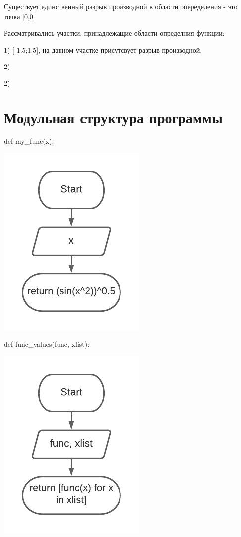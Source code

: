 Существует единственный разрыв производной в области опеределения - это точка [0,0]

Рассматривались участки, принадлежащие области определния функции: 

1) [-1.5;1.5], на данном участке присутсвует разрыв производной. 

2) \begin{math} 
	[\sqrt{300*\pi}; \sqrt{301*\pi}]
\end{math}

2) \begin{math} 
	[\sqrt{700*\pi}; \sqrt{701*\pi}]
\end{math}


\section{Модульная структура программы}

def my\_func(x):

\includegraphics[scale=0.7]{block1.pdf}

def func\_values(func, xlist):

\includegraphics[scale=0.75]{block2.pdf}



